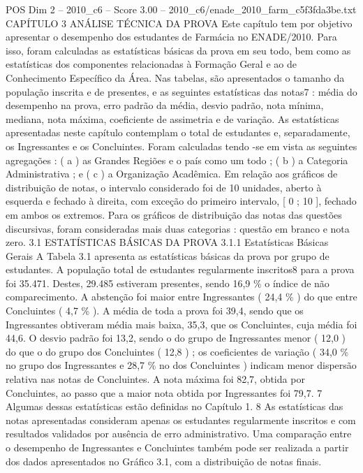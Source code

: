 \begin{textsample}{POS Dim 2 – 2010\_c6 – Score 3.00 – 2010\_c6/enade\_2010\_farm\_c5f3fda3be.txt}  \label{ex:f2_pos_182}
CAPÍTULO 3 ANÁLISE TÉCNICA DA PROVA Este capítulo tem por objetivo apresentar o desempenho dos estudantes de Farmácia no ENADE/2010.
Para isso, foram calculadas as estatísticas básicas da prova em seu todo, bem como as estatísticas dos componentes relacionadas à Formação Geral e ao de Conhecimento Específico da Área.
Nas tabelas, são apresentados o tamanho da população inscrita e de presentes, e as seguintes estatísticas das notas7 : média do desempenho na prova, erro padrão da média, desvio padrão, nota mínima, mediana, nota máxima, coeficiente de assimetria e de variação.
As estatísticas apresentadas neste capítulo contemplam o total de estudantes e, separadamente, os Ingressantes e os Concluintes.
Foram calculadas tendo -se em vista as seguintes agregações : ( a ) as Grandes Regiões e o país como um todo ; ( b ) a Categoria Administrativa ; e ( c ) a Organização Acadêmica.
Em relação aos gráficos de distribuição de notas, o intervalo considerado foi de 10 unidades, aberto à esquerda e fechado à direita, com exceção do primeiro intervalo, [ 0 ; 10 ], fechado em ambos os extremos.
Para os gráficos de distribuição das notas das questões discursivas, foram consideradas mais duas categorias : questão em branco e nota zero. 3.1 ESTATÍSTICAS BÁSICAS DA PROVA 3.1.1 Estatísticas Básicas Gerais A Tabela 3.1 apresenta as estatísticas básicas da prova por grupo de estudantes.
A população total de estudantes regularmente inscritos8 para a prova foi 35.471.
Destes, 29.485 estiveram presentes, sendo 16,9 \% o índice de não comparecimento.
A abstenção foi maior entre Ingressantes ( 24,4 \% ) do que entre Concluintes ( 4,7 \% ).
A média de toda a prova foi 39,4, sendo que os Ingressantes obtiveram média mais baixa, 35,3, que os Concluintes, cuja média foi 44,6.
O desvio padrão foi 13,2, sendo o do grupo de Ingressantes menor ( 12,0 ) do que o do grupo dos Concluintes ( 12,8 ) ; os coeficientes de variação ( 34,0 \% no grupo dos Ingressantes e 28,7 \% no dos Concluintes ) indicam menor dispersão relativa nas notas de Concluintes.
A nota máxima foi 82,7, obtida por Concluintes, ao passo que a maior nota obtida por Ingressantes foi 79,7. 7 Algumas dessas estatísticas estão definidas no Capítulo 1. 8 As estatísticas das notas apresentadas consideram apenas os estudantes regularmente inscritos e com resultados validados por ausência de erro administrativo.
Uma comparação entre o desempenho de Ingressantes e Concluintes também pode ser realizada a partir dos dados apresentados no Gráfico 3.1, com a distribuição de notas finais.

\end{textsample}
